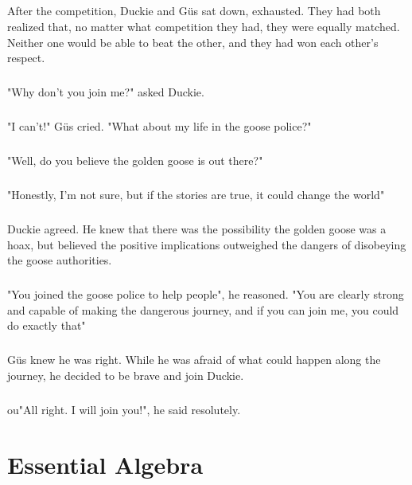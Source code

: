 \documentclass[a4paper,11pt ]{book}
\begin{document}
\paragraph{} After the competition, Duckie and Güs sat down, exhausted. They had both realized that, no matter what competition they had, they were equally matched. Neither one would be able to beat the other, and they had won each other's respect. 
\paragraph{} "Why don't you join me?" asked Duckie.
\paragraph{} "I can't!" Güs cried. "What about my life in the goose police?"
\paragraph{} "Well, do you believe the golden goose is out there?"
\paragraph{} "Honestly, I'm not sure, but if the stories are true, it could change the world"
\paragraph{} Duckie agreed. He knew that there was the possibility the golden goose was a hoax, but believed the positive implications outweighed the dangers of disobeying the goose authorities. 
\paragraph{} "You joined the goose police to help people", he reasoned. "You are clearly strong and capable of making the dangerous journey, and if you can join me, you could do exactly that"
\paragraph{} Güs knew he was right. While he was afraid of what could happen along the journey, he decided to be brave and join Duckie. 
\paragraph{} ou"All right. I will join you!", he said resolutely. 
\chapter{Essential Algebra}
\end{document}
